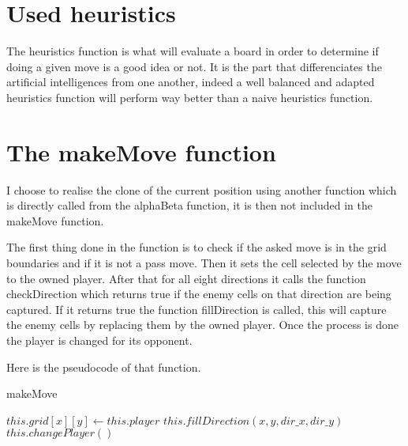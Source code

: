 \section{Used heuristics}

The heuristics function is what will evaluate a board in order to determine if doing a given move is a good idea or not.
It is the part that differenciates the artificial intelligences from one another, indeed a well balanced and adapted heuristics function will perform way better than a naive heuristics function.

\section{The makeMove function}

I choose to realise the clone of the current position using another function which is directly called from the alphaBeta function, it is then not included in the makeMove function.

The first thing done in the function is to check if the asked move is in the grid boundaries and if it is not a pass move.
Then it sets the cell selected by the move to the owned player.
After that for all eight directions it calls the function checkDirection which returns true if the enemy cells on that direction are being captured.
If it returns true the function fillDirection is called, this will capture the enemy cells by replacing them by the owned player.
Once the process is done the player is changed for its opponent.

Here is the pseudocode of that function.

\FloatBarrier
\begin{algorithm}
    \caption{makeMove}
    \begin{algorithmic}[1]
                \State $this.grid[x][y] \gets this.player$
                                \State $this.fillDirection(x, y, dir\_x, dir\_y)$
                            \EndIf
                        \EndIf
                    \EndFor
                \EndFor
                \State $this.changePlayer()$
            \EndIf
        \EndProcedure
    \end{algorithmic}
\end{algorithm}
\FloatBarrier
